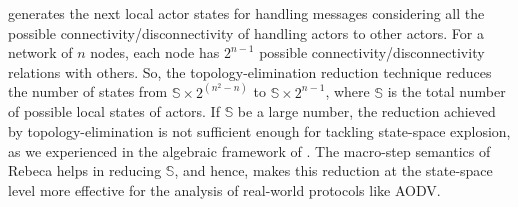 generates the next local actor states for handling messages
considering all the possible connectivity/disconnectivity of handling actors to other actors. For a network of $n$ nodes, each node has $2^{n-1}$ possible connectivity/disconnectivity relations with others. So, the topology-elimination reduction technique reduces the number of states from $\mathbb{S}\times 2^{(n^2-n)}$ to $\mathbb{S}\times2^{n-1}$, where $\mathbb{S}$ is the total number of possible local states of actors. If $\mathbb{S}$ be a large number, the reduction achieved by topology-elimination is not sufficient enough for tackling state-space explosion, as we experienced in the algebraic framework of \cite{FORM}. 
The macro-step semantics of Rebeca helps in reducing $\mathbb{S}$, and hence, makes this reduction at the state-space level more effective for the analysis of real-world protocols like AODV. %



